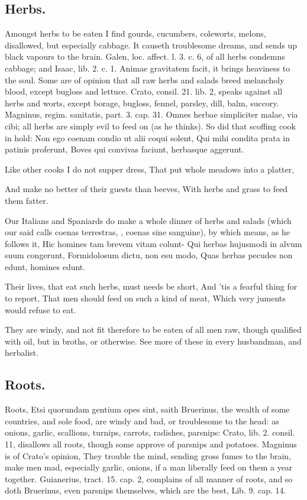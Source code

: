 {{\subsection{Herbs.}
Amongst herbs to be eaten I find gourds, cucumbers,
coleworts, melons, disallowed, but especially cabbage. It causeth
troublesome dreams, and sends up black vapours to the brain. Galen,
loc. affect. l. 3. c. 6, of all herbs condemns cabbage; and Isaac, lib.
2. c. 1. Animae gravitatem facit, it brings heaviness to the soul. Some
are of opinion that all raw herbs and salads breed melancholy blood,
except bugloss and lettuce. Crato, consil. 21. lib. 2, speaks against
all herbs and worts, except borage, bugloss, fennel, parsley, dill,
balm, succory. Magninus, regim. sanitatis, part. 3. cap. 31. Omnes
herbae simpliciter malae, via cibi; all herbs are simply evil to feed
on (as he thinks). So did that scoffing cook in \Plautus{} hold:
Non ego coenam condio ut alii coqui solent,
Qui mihi condita prata in patinis proferunt,
Boves qui convivas faciunt, herbasque aggerunt.


Like other cooks I do not supper dress,
That put whole meadows into a platter,

And make no better of their guests than beeves,
With herbs and grass to feed them fatter.

Our Italians and Spaniards do make a whole dinner of herbs and salads
(which our said \Plautus{} calls coenas terrestras, \Horace{}, coenas sine
sanguine), by which means, as he follows it,
Hic homines tam brevem vitam colunt-
Qui herbas hujusmodi in alvum suum congerunt,
Formidolosum dictu, non esu modo,
Quas herbas pecudes non edunt, homines edunt.

Their lives, that eat such herbs, must needs be short,
And 'tis a fearful thing for to report,
That men should feed on such a kind of meat,
Which very juments would refuse to eat.

They are windy, and not fit therefore to be eaten of all men raw,
though qualified with oil, but in broths, or otherwise. See more of
these in every husbandman, and herbalist.
\subsection{Roots.}
Roots, Etsi quorundam gentium opes sint, saith Bruerinus, the
wealth of some countries, and sole food, are windy and bad, or
troublesome to the head: as onions, garlic, scallions, turnips,
carrots, radishes, parsnips: Crato, lib. 2. consil. 11, disallows all
roots, though  some approve of parsnips and potatoes.
Magninus is of Crato's opinion, They trouble the mind,
sending gross fumes to the brain, make men mad, especially garlic,
onions, if a man liberally feed on them a year together. Guianerius,
tract. 15. cap. 2, complains of all manner of roots, and so doth
Bruerinus, even parsnips themselves, which are the best, Lib. 9. cap.
14.
}}
